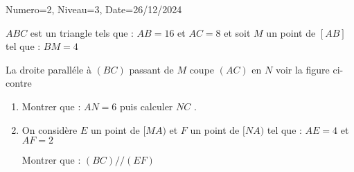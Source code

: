 \documentclass[a4paper,12pt]{article}
\begin{document}
\begin{Maquette}[DS]{Numero=2, Niveau=3, Date=26/12/2024}
\begin{exercice}
\begin{minipage}{0.4\linewidth}
\end{minipage}
\begin{minipage}{0.6\linewidth}
$ABC$ est un triangle tels que : $AB=16$ et $AC=8$ et soit  $M$ un point de  $[AB]$ tel que : $BM=4$

La droite paralléle à $(BC)$ passant de $M$ coupe  $(AC)$ en $N$ voir la figure ci-contre
\begin{enumerate}
\item{} Montrer que : $AN=6$ puis calculer $NC$ .
\item{} On considère $E$ un point de $[MA)$ et $F$ un point de $[NA)$ tel que : $AE=4$ et $AF=2$

Montrer que : $(BC)//(EF)$
\end{enumerate}
\end{minipage}%

\begin{minipage}{\linewidth}
\end{minipage}

\end{exercice}


\end{Maquette}
\end{document}
